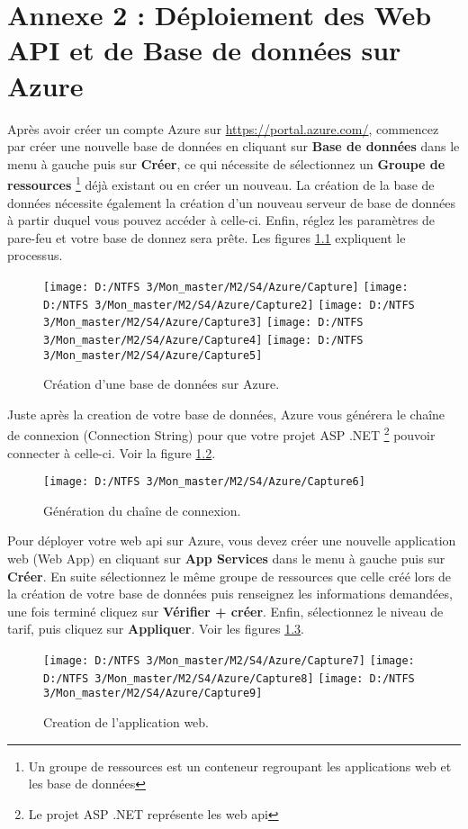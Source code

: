 \chapter{Annexe 2 : Déploiement des Web API et de Base de données sur Azure}
\label{chap:annexe2}

Après avoir créer un compte Azure sur \href{https://portal.azure.com/}{https://portal.azure.com/}, commencez par créer une nouvelle base de données en cliquant sur \textbf{Base de données} dans le menu à gauche puis sur \textbf{Créer}, ce qui nécessite de sélectionnez un \textbf{Groupe de ressources} \footnote{Un groupe de ressources est un conteneur regroupant les applications web et les base de données} déjà existant ou en créer un nouveau. La création de la base de données nécessite également la création d'un nouveau serveur de base de données à partir duquel vous pouvez accéder à celle-ci. Enfin, réglez les paramètres de pare-feu et votre base de donnez sera prête. Les figures \ref{Figure 8.1} expliquent le processus.
\begin{figure}[!ht]
	\texttt{[image: D:/NTFS 3/Mon\_master/M2/S4/Azure/Capture]}
	\texttt{[image: D:/NTFS 3/Mon\_master/M2/S4/Azure/Capture2]}
	\texttt{[image: D:/NTFS 3/Mon\_master/M2/S4/Azure/Capture3]}
	\texttt{[image: D:/NTFS 3/Mon\_master/M2/S4/Azure/Capture4]}
	\texttt{[image: D:/NTFS 3/Mon\_master/M2/S4/Azure/Capture5]}
	\centering
	\caption{Création d'une base de données sur Azure.}
	\label{Figure 8.1}
\end{figure}
\newline Juste après la creation de votre base de données, Azure vous générera le chaîne de connexion (Connection String) pour que votre projet ASP .NET \footnote{Le projet ASP .NET représente les web api} pouvoir connecter à celle-ci. Voir la figure \ref{Figure 8.2}.
\begin{figure}[!ht]
	\texttt{[image: D:/NTFS 3/Mon\_master/M2/S4/Azure/Capture6]}
	\centering
	\caption{Génération du chaîne de connexion.}
	\label{Figure 8.2}
\end{figure}
\newline Pour déployer votre web api sur Azure, vous devez créer une nouvelle application web (Web App) en cliquant sur \textbf{App Services} dans le menu à gauche puis sur \textbf{Créer}. En suite sélectionnez le même groupe de ressources que celle créé lors de la création de votre base de données puis renseignez les informations demandées, une fois terminé cliquez sur \textbf{Vérifier + créer}. Enfin, sélectionnez le niveau de tarif, puis cliquez sur \textbf{Appliquer}. Voir les figures \ref{Figure 8.3}.
\begin{figure}[!ht]
	\texttt{[image: D:/NTFS 3/Mon\_master/M2/S4/Azure/Capture7]}
	\texttt{[image: D:/NTFS 3/Mon\_master/M2/S4/Azure/Capture8]}
	\texttt{[image: D:/NTFS 3/Mon\_master/M2/S4/Azure/Capture9]}
	\centering
	\caption{Creation de l'application web.}
	\label{Figure 8.3}
\end{figure}